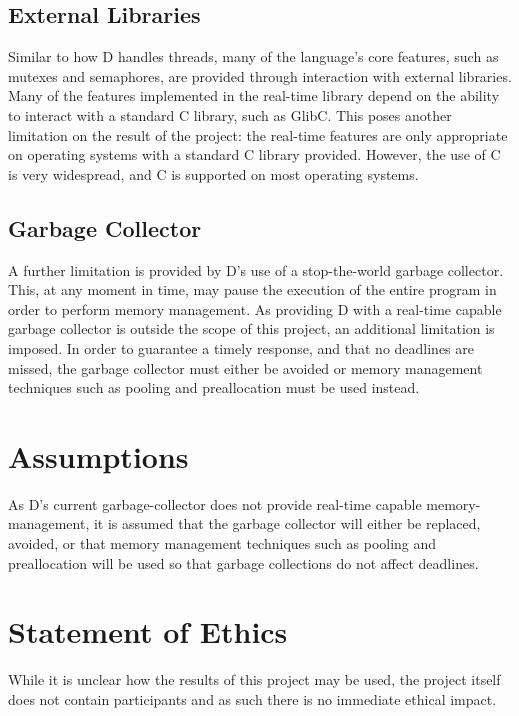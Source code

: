 \subsection{External Libraries}

Similar to how D handles threads, many of the language's core features, such as 
mutexes and semaphores, are provided through interaction with external libraries. 
Many of the features implemented in the real-time library depend on the ability 
to interact with a standard C library, such as GlibC. This poses another limitation 
on the result of the project: the real-time features are only appropriate on 
operating systems with a standard C library provided. However, the use of C is 
very widespread, and C is supported on most operating systems. 

\subsection{Garbage Collector}
A further limitation is provided by D's use of a stop-the-world garbage collector. 
This, at any moment in time, may pause the execution of the entire program in 
order to perform memory management. As providing D with a real-time capable 
garbage collector is outside the scope of this project, an additional limitation 
is imposed. In order to guarantee a timely response, and that no 
deadlines are missed, the garbage collector must either be avoided or memory 
management techniques such as pooling and preallocation must be used instead. 

\section{Assumptions} 
As D's current garbage-collector does not provide real-time capable
memory-management, it is assumed that the garbage collector will either be replaced, 
avoided, or that memory management techniques such as pooling and preallocation 
will be used so that garbage collections do not affect deadlines. 

\section{Statement of Ethics}
While it is unclear how the results of this project may be used, the project 
itself does not contain participants and as such there is no immediate ethical impact.

